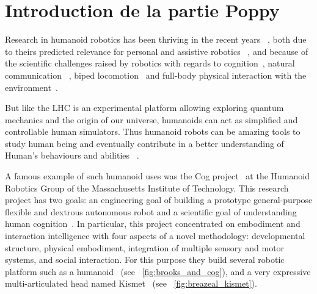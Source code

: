 





\section{Introduction de la partie Poppy} %

Research in humanoid robotics has been thriving in the recent years~\cite{hirai1998development} \cite{kaneko2008humanoid}, both due to theirs predicted relevance for personal and assistive robotics~\cite{tapus2007socially} \cite{oztop2005human}, and because of the scientific challenges raised by robotics with regards to cognition~\cite{asada2001cognitive}, natural communication~\cite{stiefelhagen2004natural} \cite{breazeal2002robots}, biped locomotion~\cite{yamaguchi1999development} \cite{chestnutt2005footstep} \cite{collins2005bipedal} and full-body physical interaction with the environment~\cite{ude2004programming}.

But like the LHC is an experimental platform allowing exploring quantum mechanics and the origin of our universe,  humanoids can act as simplified and controllable human simulators. Thus humanoid robots can be amazing tools to study human being and eventually contribute in a better understanding of Human's behaviours and abilities~\cite{atkeson2000using} \cite{cheng2007cb} \cite{brooks1986achieving}.

A famous example of such humanoid uses was the Cog project~\cite{brooks1999cog} at the Humanoid Robotics Group of the Massachusetts Institute of Technology. This research project has two goals: an engineering goal of building a prototype general-purpose flexible and dextrous autonomous robot and a scientific goal of understanding human cognition~\cite{brooks1994building}. In particular, this project concentrated on embodiment and interaction intelligence with four aspects of a novel methodology: developmental structure, physical embodiment, integration of multiple sensory and motor systems, and social interaction. For this purpose they build several robotic platform such as a humanoid~\cite{brooks1999cog} (see \figurename~\ref{fig:brooks_and_cog}), and a very expressive multi-articulated head named Kismet~\cite{breazeal2003emotion} (see \figurename~\ref{fig:breazeal_kismet}).

